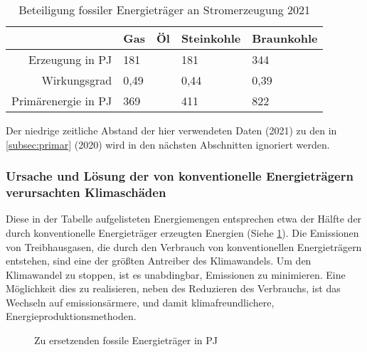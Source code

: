 \documentclass[12pt, ngerman]{article}
\newcommand{\pe}{_{\mathrm{PE}}}
\newcommand{\el}{_{\mathrm{el}}}
\begin{document}
\begin{table}[!h]
    \begin{tabular}{r|llll}
        \toprule
                                           & Gas  & Öl & Steinkohle & Braunkohle \\
        \midrule
        Erzeugung in \unit{PJ\el}          & 181  &    & 181        & 344        \\
        Wirkungsgrad \protect\footnotemark & 0,49 &    & 0,44       & 0,39       \\
        \midrule
        Primärenergie in \unit{PJ\pe}      & 369  &    & 411        & 822        \\
        \bottomrule
    \end{tabular}
    \caption{Beteiligung fossiler Energieträger an Stromerzeugung 2021}
\end{table}

Der niedrige zeitliche Abstand der hier verwendeten Daten (2021) zu den in \cref{subsec:primar} (2020)
wird in den nächsten Abschnitten ignoriert werden.

\subsubsection{Ursache und Lösung der von konventionelle Energieträgern verursachten Klimaschäden}

Diese in der Tabelle aufgelisteten Energiemengen entsprechen etwa der Hälfte
der durch konventionelle Energieträger erzeugten Energien (Siehe \cref{fig:kon}).
Die Emissionen von Treibhausgasen, die durch den Verbrauch von konventionellen Energieträgern
entstehen, sind eine der größten Antreiber des Klimawandels.
Um den Klimawandel zu stoppen, ist es unabdingbar, Emissionen zu minimieren.
Eine Möglichkeit dies zu realisieren, neben des Reduzieren des Verbrauchs,
ist das Wechseln auf emissionsärmere, und damit klimafreundlichere,
Energieproduktionsmethoden. %

\begin{figure}[!h]
    \caption{Zu ersetzenden fossile Energieträger in \unit{PJ\pe}}
    \label{fig:kon}
\end{figure}
\end{document}
